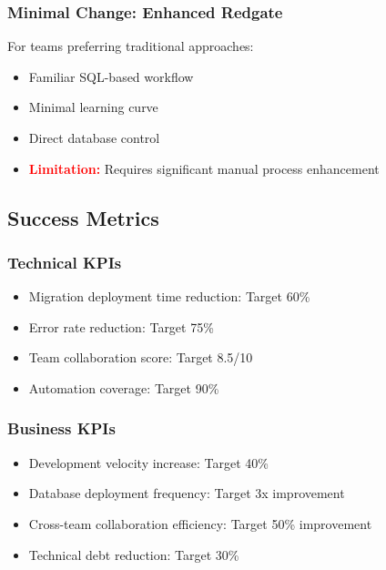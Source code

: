 \subsubsection{Minimal Change: Enhanced Redgate}
For teams preferring traditional approaches:
\begin{itemize}
    \item Familiar SQL-based workflow
    \item Minimal learning curve
    \item Direct database control
    \item \textcolor{red}{\textbf{Limitation:}} Requires significant manual process enhancement
\end{itemize}

\subsection{Success Metrics}

\subsubsection{Technical KPIs}
\begin{itemize}
    \item Migration deployment time reduction: Target 60\%
    \item Error rate reduction: Target 75\%
    \item Team collaboration score: Target 8.5/10
    \item Automation coverage: Target 90\%
\end{itemize}

\subsubsection{Business KPIs}
\begin{itemize}
    \item Development velocity increase: Target 40\%
    \item Database deployment frequency: Target 3x improvement
    \item Cross-team collaboration efficiency: Target 50\% improvement
    \item Technical debt reduction: Target 30\%
\end{itemize}
